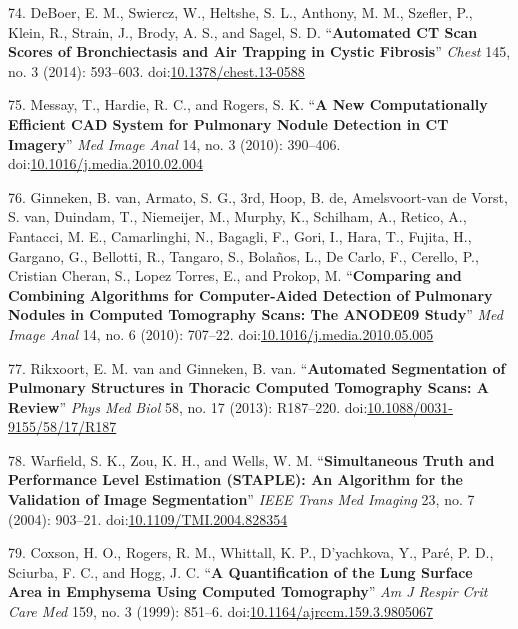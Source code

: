 \documentclass[11pt,]{article}
\begin{document}
\hypertarget{ref-DeBoer:2014aa}{}
74. DeBoer, E. M., Swiercz, W., Heltshe, S. L., Anthony, M. M., Szefler,
P., Klein, R., Strain, J., Brody, A. S., and Sagel, S. D.
``\textbf{Automated CT Scan Scores of Bronchiectasis and Air Trapping in
Cystic Fibrosis}'' \emph{Chest} 145, no. 3 (2014): 593--603.
doi:\href{https://doi.org/10.1378/chest.13-0588}{10.1378/chest.13-0588}

\hypertarget{ref-Messay:2010aa}{}
75. Messay, T., Hardie, R. C., and Rogers, S. K. ``\textbf{A New
Computationally Efficient CAD System for Pulmonary Nodule Detection in
CT Imagery}'' \emph{Med Image Anal} 14, no. 3 (2010): 390--406.
doi:\href{https://doi.org/10.1016/j.media.2010.02.004}{10.1016/j.media.2010.02.004}

\hypertarget{ref-Ginneken:2010aa}{}
76. Ginneken, B. van, Armato, S. G., 3rd, Hoop, B. de, Amelsvoort-van de
Vorst, S. van, Duindam, T., Niemeijer, M., Murphy, K., Schilham, A.,
Retico, A., Fantacci, M. E., Camarlinghi, N., Bagagli, F., Gori, I.,
Hara, T., Fujita, H., Gargano, G., Bellotti, R., Tangaro, S., Bolaños,
L., De Carlo, F., Cerello, P., Cristian Cheran, S., Lopez Torres, E.,
and Prokop, M. ``\textbf{Comparing and Combining Algorithms for
Computer-Aided Detection of Pulmonary Nodules in Computed Tomography
Scans: The ANODE09 Study}'' \emph{Med Image Anal} 14, no. 6 (2010):
707--22.
doi:\href{https://doi.org/10.1016/j.media.2010.05.005}{10.1016/j.media.2010.05.005}

\hypertarget{ref-Rikxoort:2013aa}{}
77. Rikxoort, E. M. van and Ginneken, B. van. ``\textbf{Automated
Segmentation of Pulmonary Structures in Thoracic Computed Tomography
Scans: A Review}'' \emph{Phys Med Biol} 58, no. 17 (2013): R187--220.
doi:\href{https://doi.org/10.1088/0031-9155/58/17/R187}{10.1088/0031-9155/58/17/R187}

\hypertarget{ref-Warfield:2004aa}{}
78. Warfield, S. K., Zou, K. H., and Wells, W. M. ``\textbf{Simultaneous
Truth and Performance Level Estimation (STAPLE): An Algorithm for the
Validation of Image Segmentation}'' \emph{IEEE Trans Med Imaging} 23,
no. 7 (2004): 903--21.
doi:\href{https://doi.org/10.1109/TMI.2004.828354}{10.1109/TMI.2004.828354}

\hypertarget{ref-Coxson:1999aa}{}
79. Coxson, H. O., Rogers, R. M., Whittall, K. P., D'yachkova, Y., Paré,
P. D., Sciurba, F. C., and Hogg, J. C. ``\textbf{A Quantification of the
Lung Surface Area in Emphysema Using Computed Tomography}'' \emph{Am J
Respir Crit Care Med} 159, no. 3 (1999): 851--6.
doi:\href{https://doi.org/10.1164/ajrccm.159.3.9805067}{10.1164/ajrccm.159.3.9805067}
\end{document}
